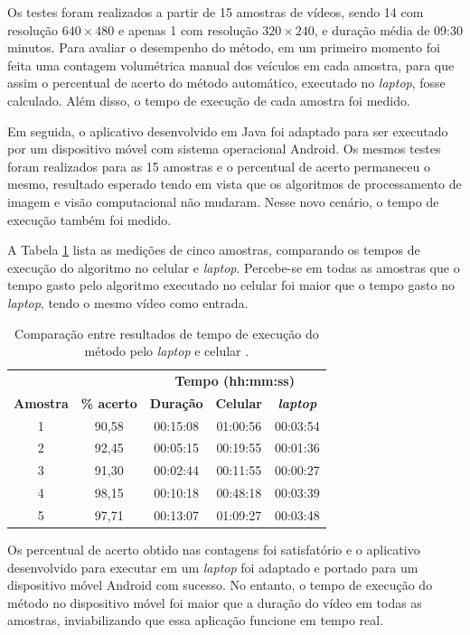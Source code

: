 Os testes foram realizados a partir de 15 amostras de vídeos, sendo 14 com resolução $640\times 480$ e apenas 1 com resolução $320\times 240$, e duração média de 09:30 minutos. Para avaliar o desempenho do método, em um primeiro momento foi feita uma contagem volumétrica manual dos veículos em cada amostra, para que assim o percentual de acerto do método automático, executado no \textit{laptop}, fosse calculado. Além disso, o tempo de execução de cada amostra foi medido.

Em seguida, o aplicativo desenvolvido em Java foi adaptado para ser executado por um dispositivo móvel com sistema operacional Android. Os mesmos testes foram realizados para as 15 amostras e o percentual de acerto permaneceu o mesmo, resultado esperado tendo em vista que os algoritmos de processamento de imagem e visão computacional não mudaram. Nesse novo cenário, o tempo de execução também foi medido.

A Tabela \ref{tab:feitosa} lista as medições de cinco amostras, comparando os tempos de execução do algoritmo no celular e \textit{laptop}. Percebe-se em todas as amostras que o tempo gasto pelo algoritmo executado no celular foi maior que o tempo gasto no \textit{laptop}, tendo o mesmo vídeo como entrada. 

\begin{table}[ht]
  \caption{Comparação entre resultados de tempo de execução do método pelo \textit{laptop} e celular \citep{feitosa:2012:masther}.}
  \label{tab:feitosa}
  \begin{center}
    \begin{tabular}{ccccc}
    \toprule
    \multicolumn{2}{c}{} & \multicolumn{3}{c}{\textbf{Tempo (hh:mm:ss)}} \\
    \cline{3-5}
    \textbf{Amostra} & \textbf{\% acerto} & \textbf{Duração} & \textbf{Celular} & \textbf{\textit{laptop}}\\
    \midrule
      1 & 90,58 & 00:15:08 & 01:00:56 & 00:03:54\\
      2 & 92,45 & 00:05:15 & 00:19:55 & 00:01:36\\
      3 & 91,30 & 00:02:44 & 00:11:55 & 00:00:27\\
      4 & 98,15 & 00:10:18 & 00:48:18 & 00:03:39\\
      5 & 97,71 & 00:13:07 & 01:09:27 & 00:03:48\\
    \bottomrule
    \end{tabular}
  \end{center}
\end{table}

Os percentual de acerto obtido nas contagens foi satisfatório e o aplicativo desenvolvido para executar em um \textit{laptop} foi adaptado e portado para um dispositivo móvel Android com sucesso. No entanto, o tempo de execução do método no dispositivo móvel foi maior que a duração do vídeo em todas as amostras, inviabilizando que essa aplicação funcione em tempo real.


